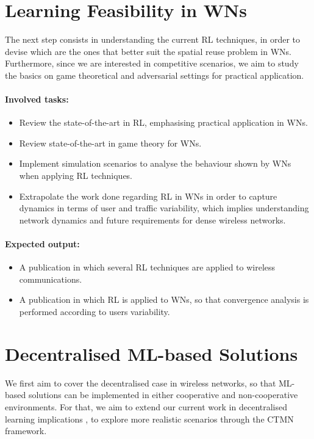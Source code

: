 \documentclass[12pt, a4paper,twoside]{tesi_upf}
\begin{document}
		\section{Learning Feasibility in WNs}
		\label{section:contribution2}
			The next step consists in understanding the current RL techniques, in order to devise which are the ones that better suit the spatial reuse problem in WNs. Furthermore, since we are interested in competitive scenarios, we aim to study the basics on game theoretical and adversarial settings for practical application.			
			\paragraph{Involved tasks:}		
			\begin{itemize}
				\item Review the state-of-the-art in RL, emphasising practical application in WNs.
				\item Review state-of-the-art in game theory for WNs.
				\item Implement simulation scenarios to analyse the behaviour shown by WNs when applying RL techniques.
				\item Extrapolate the work done regarding RL in WNs in order to capture dynamics in terms of user and traffic variability, which implies understanding network dynamics and future requirements for dense wireless networks.	
			\end{itemize}	
			\paragraph{Expected output:}		
			\begin{itemize}
				\item A publication in which several RL techniques are applied to wireless communications.				
				\item A publication in which RL is applied to WNs, so that convergence analysis is performed according to users variability.
			\end{itemize}		
		
		\section{Decentralised ML-based Solutions}
		\label{section:contribution3}	
			We first aim to cover the decentralised case in wireless networks, so that ML-based solutions can be implemented in either cooperative and non-cooperative environments.  For that, we aim to extend our current work in decentralised learning implications \cite{wilhelmi2017implications, wilhelmi2017enhancing}, to explore more realistic scenarios through the CTMN framework. 
				
\end{document}
